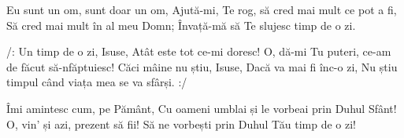 \beginverse
Eu sunt un om, sunt doar un om,
Ajută-mi, Te rog, să cred mai mult ce pot a fi,
Să cred mai mult în al meu Domn;
Învață-mă să Te slujesc timp de o zi.
\endverse

\beginchorus
/: Un timp de o zi, Isuse,
Atât este tot ce-mi doresc!
O, dă-mi Tu puteri, ce-am de făcut să-nfăptuiesc!
Căci mâine nu știu, Isuse,
Dacă va mai fi înc-o zi,
Nu știu timpul când viața mea se va sfârși. :/
\endchorus

\beginverse
Îmi amintesc cum, pe Pământ,
Cu oameni umblai și le vorbeai prin Duhul Sfânt!
O, vin’ și azi, prezent să fii!
Să ne vorbești prin Duhul Tău timp de o zi!
\endverse
\endsong